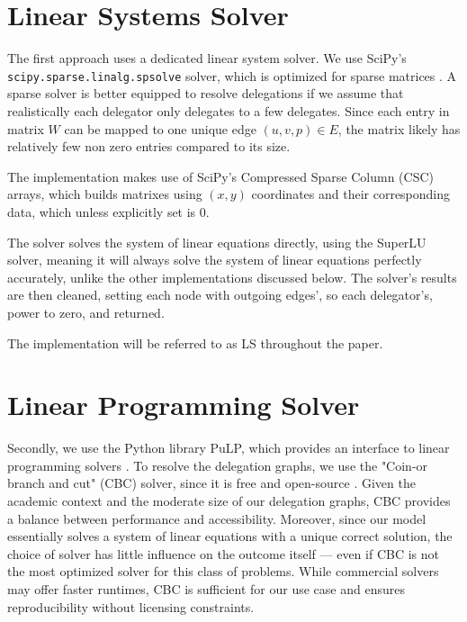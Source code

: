 \section{Linear Systems Solver}

The first approach uses a dedicated linear system solver. We use SciPy's \texttt{scipy.sparse.linalg.spsolve} solver, which is optimized for sparse matrices \cite{virtanenSciPy10Fundamental2020}. A sparse solver is better equipped to resolve delegations if we assume that realistically each delegator only delegates to a few delegates. Since each entry in matrix $W$ can be mapped to one unique edge $(u, v, p) \in E$, the matrix likely has relatively few non zero entries compared to its size.
 
 The implementation makes use of SciPy's Compressed Sparse Column (CSC) arrays, which builds matrixes using $(x,y)$ coordinates and their corresponding data, which unless explicitly set is 0. \cite{virtanenSciPy10Fundamental2020}

The solver solves the system of linear equations directly, using the SuperLU solver, meaning it will always solve the system of linear equations perfectly accurately, unlike the other implementations discussed below. \cite{liSuperLUUsersGuide1999} The solver's results are then cleaned, setting each node with outgoing edges', so each delegator's, power to zero, and returned.

The implementation will be referred to as \ac{LS} throughout the paper.

\section{Linear Programming Solver}

Secondly, we use the Python library PuLP, which provides an interface to linear programming solvers \cite{osullivanPuLPLinearProgramming2011}. To resolve the delegation graphs, we use the "Coin-or branch and cut" (CBC) solver, since it is free and open-source \cite{johnforrestCoinorCbcRelease2024}. Given the academic context and the moderate size of our delegation graphs, CBC provides a balance between performance and accessibility. Moreover, since our model essentially solves a system of linear equations with a unique correct solution, the choice of solver has little influence on the outcome itself — even if CBC is not the most optimized solver for this class of problems. While commercial solvers may offer faster runtimes, CBC is sufficient for our use case and ensures reproducibility without licensing constraints.


